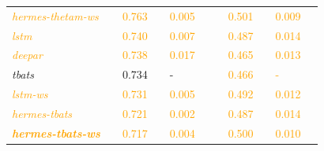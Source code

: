 \documentclass[10pt]{article} %
\begin{document}
\begin{table}
{\begin{tabular}{l||lllll|lllll}
     \textcolor{orange}{\textit{hermes-thetam-ws}} && \textcolor{orange}{0.763} && \textcolor{orange}{0.005} &&& \textcolor{orange}{0.501} && \textcolor{orange}{0.009} &\\
     \textcolor{orange}{\textit{lstm}} && \textcolor{orange}{0.740} && \textcolor{orange}{0.007} &&& \textcolor{orange}{0.487} && \textcolor{orange}{0.014} &\\
     \textcolor{orange}{\textit{deepar}} && \textcolor{orange}{0.738} && \textcolor{orange}{0.017} &&& \textcolor{orange}{0.465} && \textcolor{orange}{0.013} &\\
     \textit{tbats} && 0.734 && - &&& \textcolor{orange}{0.466} && \textcolor{orange}{-} &\\
     \textcolor{orange}{\textit{lstm-ws}} && \textcolor{orange}{0.731} && \textcolor{orange}{0.005} &&& \textcolor{orange}{0.492} && \textcolor{orange}{0.012} &\\
     \textcolor{orange}{\textit{hermes-tbats}} && \textcolor{orange}{0.721} && \textcolor{orange}{0.002} &&& \textcolor{orange}{0.487} && \textcolor{orange}{0.014} &\\
     \textcolor{orange}{\textbf{\textit{hermes-tbats-ws}}} && \textcolor{orange}{0.717} && \textcolor{orange}{0.004} &&& \textcolor{orange}{0.500} && \textcolor{orange}{0.010} &\\
     
  \end{tabular}\hspace{1cm}
\vspace{.2cm}

}
\end{table}
\end{document}
